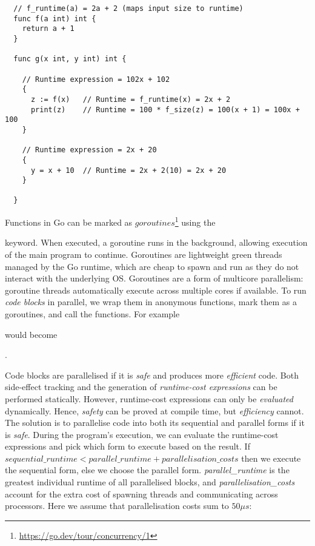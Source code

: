 \begin{verbatim}
  // f_runtime(a) = 2a + 2 (maps input size to runtime)
  func f(a int) int { 
    return a + 1
  }

  func g(x int, y int) int { 

    // Runtime expression = 102x + 102 
    {
      z := f(x)   // Runtime = f_runtime(x) = 2x + 2
      print(z)    // Runtime = 100 * f_size(z) = 100(x + 1) = 100x + 100
    }             

    // Runtime expression = 2x + 20 
    {
      y = x + 10  // Runtime = 2x + 2(10) = 2x + 20 
    }

  }
\end{verbatim}

Functions in Go can be marked as \( goroutines \)\footnote{\url{https://go.dev/tour/concurrency/1}} using the  keyword. When executed, a goroutine runs in the background, allowing execution of the main program to continue. Goroutines are lightweight green threads managed by the Go runtime, which are cheap to spawn and run as they do not interact with the underlying OS. Goroutines are a form of multicore parallelism: goroutine threads automatically execute across multiple cores if available. To run \textit{code blocks} in parallel, we wrap them in anonymous functions, mark them as a goroutines, and call the functions. For example  would become .

Code blocks are parallelised if it is \textit{safe} and produces more \textit{efficient} code. Both side-effect tracking and the generation of \textit{runtime-cost expressions} can be performed statically. However, runtime-cost expressions can only be \textit{evaluated} dynamically. Hence, \textit{safety} can be proved at compile time, but \textit{efficiency} cannot. The solution is to parallelise code into both its sequential and parallel forms if it is \textit{safe}. During the program's execution, we can evaluate the runtime-cost expressions and pick which form to execute based on the result. If \( { \textit{sequential\_runtime} < \textit{parallel\_runtime} + \textit{parallelisation\_costs} } \) then we execute the sequential form, else we choose the parallel form. \textit{parallel\_runtime} is the greatest individual runtime of all parallelised blocks, and \textit{parallelisation\_costs} account for the extra cost of spawning threads and communicating across processors. Here we assume that parallelisation costs sum to \( 50 \mu s\):

